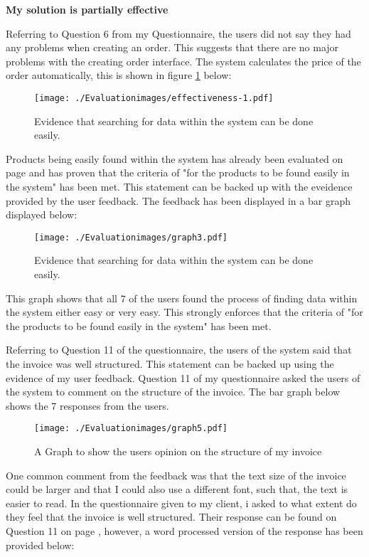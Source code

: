 \textbf{\large{My solution is partially effective}}

Referring to Question 6 from my Questionnaire, the users did not say they had any problems when creating an order. This suggests that there are no major problems with the creating order interface. The system calculates the price of the order automatically, this is shown in figure \ref{fig:effectiveness-1} below:

\begin{figure}[H]
\caption{Evidence that searching for data within the system can be done easily.} \label{fig:effectiveness-1}
\hfill\texttt{[image: ./Evaluationimages/effectiveness-1.pdf]}
\end{figure}

Products being easily found within the system has already been evaluated on page \pageref{fig:search-evidence} and has proven that the criteria of "for the products to be found easily in the system" has been met. This statement can be backed up with the eveidence provided by the user feedback. The feedback has been displayed in a bar graph displayed below:

\begin{figure}[H]
\caption{Evidence that searching for data within the system can be done easily.} \label{graph3}
\hfill\texttt{[image: ./Evaluationimages/graph3.pdf]}
\end{figure}

This graph shows that all 7 of the users found the process of finding data within the system either easy or very easy. This strongly enforces that the criteria of "for the products to be found easily in the system" has been met.

Referring to Question 11 of the questionnaire, the users of the system said that the invoice was well structured. This statement can be backed up using the evidence of my user feedback. Question 11 of my questionnaire asked the users of the system to comment on the structure of the invoice. The bar graph below shows the 7 responses from the users.

 \begin{figure}[H]
\caption{A Graph to show the users opinion on the structure of my invoice} \label{graph5}
\hfill\texttt{[image: ./Evaluationimages/graph5.pdf]}
\end{figure}

One common comment from the feedback was that the text size of the invoice could be larger and that I could also use a different font, such that, the text is easier to read. In the questionnaire given to my client, i asked to what extent do they feel that the invoice is well structured. Their response can be found on Question 11 on page \pageref{Client-Q1}, however, a word processed version of the response has been provided below:

